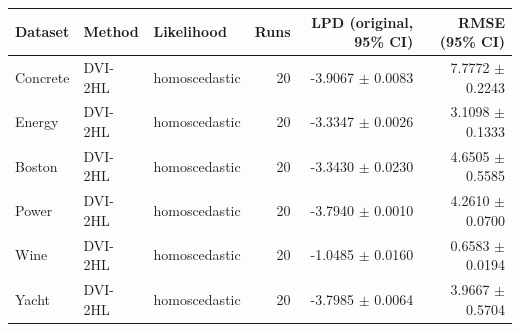 \begin{tabular}{lllrrr}
\toprule
Dataset & Method & Likelihood & Runs & LPD (original, 95\% CI) & RMSE (95\% CI) \\
\midrule
Concrete & DVI-2HL & homoscedastic & 20 & -3.9067 $\pm$ 0.0083 & 7.7772 $\pm$ 0.2243 \\
Energy & DVI-2HL & homoscedastic & 20 & -3.3347 $\pm$ 0.0026 & 3.1098 $\pm$ 0.1333 \\
Boston & DVI-2HL & homoscedastic & 20 & -3.3430 $\pm$ 0.0230 & 4.6505 $\pm$ 0.5585 \\
Power & DVI-2HL & homoscedastic & 20 & -3.7940 $\pm$ 0.0010 & 4.2610 $\pm$ 0.0700 \\
Wine & DVI-2HL & homoscedastic & 20 & -1.0485 $\pm$ 0.0160 & 0.6583 $\pm$ 0.0194 \\
Yacht & DVI-2HL & homoscedastic & 20 & -3.7985 $\pm$ 0.0064 & 3.9667 $\pm$ 0.5704 \\
\bottomrule
\end{tabular}
